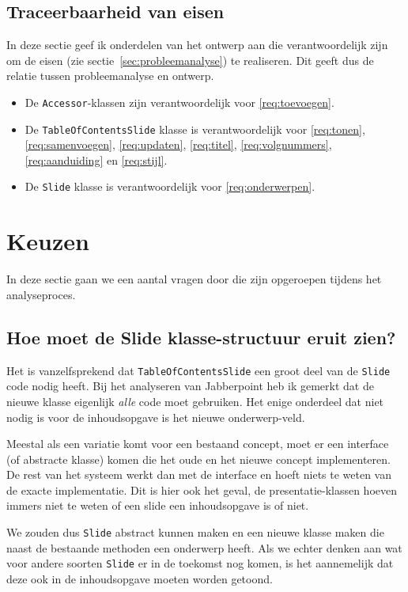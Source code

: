 \documentclass[a4paper]{article}
\newcommand{\reqref}[1]{\ref{req:#1}}
\newcommand{\question}[1]{
  \subsection{#1}
}
\newcommand{\code}[1]{\lstinline[columns=fixed]{#1}}
\begin{document}
    \subsection{Traceerbaarheid van eisen}
        In deze sectie geef ik onderdelen van het ontwerp aan die verantwoordelijk zijn om de eisen (zie sectie~\ref{sec:probleemanalyse}) te realiseren.
        Dit geeft dus de relatie tussen probleemanalyse en ontwerp.

        \begin{itemize}
            \item De \code{Accessor}-klassen zijn verantwoordelijk voor \reqref{toevoegen}.
            \item De \code{TableOfContentsSlide} klasse is verantwoordelijk voor \reqref{tonen}, \reqref{samenvoegen},
                \reqref{updaten}, \reqref{titel}, \reqref{volgnummers}, \reqref{aanduiding} en \reqref{stijl}.
            \item De \code{Slide} klasse is verantwoordelijk voor \reqref{onderwerpen}.
        \end{itemize}


\section{Keuzen}\label{sec:keuzen}
    In deze sectie gaan we een aantal vragen door die zijn opgeroepen tijdens het analyseproces.
    
    \question{Hoe moet de Slide klasse-structuur eruit zien?}
    Het is vanzelfsprekend dat \code{TableOfContentsSlide} een groot deel van de \code{Slide} code nodig heeft.
    Bij het analyseren van Jabberpoint heb ik gemerkt dat de nieuwe klasse eigenlijk \textit{alle} code moet gebruiken.
    Het enige onderdeel dat niet nodig is voor de inhoudsopgave is het nieuwe onderwerp-veld.
    
    Meestal als een variatie komt voor een bestaand concept, moet er een interface (of abstracte klasse) komen die het oude en het nieuwe concept implementeren.
    De rest van het systeem werkt dan met de interface en hoeft niets te weten van de exacte implementatie.
    Dit is hier ook het geval, de presentatie-klassen hoeven immers niet te weten of een slide een inhoudsopgave is of niet.
    
    We zouden dus \code{Slide} abstract kunnen maken en een nieuwe klasse maken die naast de bestaande methoden een onderwerp heeft.
    Als we echter denken aan wat voor andere soorten \code{Slide} er in de toekomst nog komen, is het aannemelijk dat deze ook in de inhoudsopgave moeten worden getoond.
    
\end{document}
